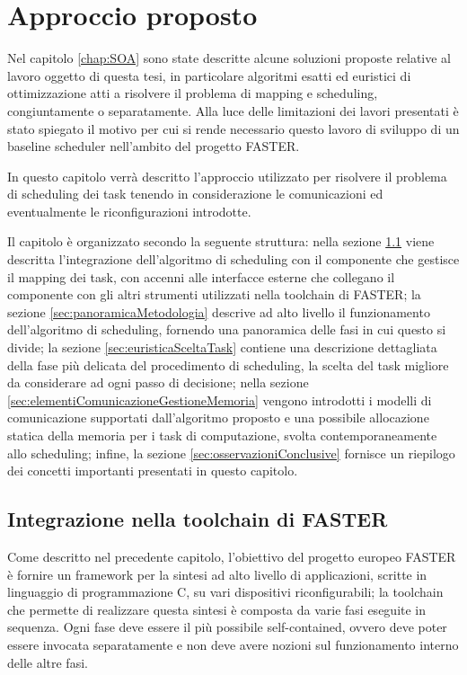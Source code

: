 \chapter{Approccio proposto}
\label{chap:approccio}
\vspace{1cm}
Nel capitolo \ref{chap:SOA} sono state descritte alcune soluzioni proposte 
relative al lavoro oggetto di questa tesi, in particolare algoritmi esatti ed
euristici di ottimizzazione atti a risolvere il problema di mapping e 
scheduling, congiuntamente o separatamente. Alla luce delle limitazioni dei 
lavori presentati è stato spiegato il motivo per cui si rende necessario questo 
lavoro di sviluppo di un baseline scheduler nell'ambito del progetto 
\ac{FASTER}.

In questo capitolo verrà descritto l'approccio utilizzato per risolvere il 
problema di scheduling dei task tenendo in considerazione le comunicazioni ed
eventualmente le riconfigurazioni introdotte.

Il capitolo è organizzato secondo la seguente struttura: nella sezione 
\ref{sec:integrazioneToolchainFASTER} viene descritta l'integrazione 
dell'algoritmo di scheduling con il componente che gestisce il mapping dei task, 
con accenni alle interfacce esterne che collegano il componente 
con gli altri strumenti utilizzati nella toolchain di \acs{FASTER}; la sezione 
\ref{sec:panoramicaMetodologia} descrive ad alto livello il funzionamento 
dell'algoritmo di scheduling, fornendo una panoramica delle fasi in cui questo 
si divide; la sezione \ref{sec:euristicaSceltaTask} contiene una descrizione 
dettagliata della fase più delicata del procedimento di scheduling, la scelta 
del task migliore da considerare ad ogni passo di decisione; nella sezione 
\ref{sec:elementiComunicazioneGestioneMemoria} vengono introdotti i modelli di 
comunicazione supportati dall'algoritmo proposto e una possibile allocazione 
statica della memoria per i task di computazione, svolta contemporaneamente allo 
scheduling; infine, la sezione \ref{sec:osservazioniConclusive} fornisce un 
riepilogo dei concetti importanti presentati in questo capitolo.


\section{Integrazione nella toolchain di \acs{FASTER}}
\label{sec:integrazioneToolchainFASTER}

Come descritto nel precedente capitolo, l'obiettivo del progetto europeo 
\ac{FASTER} è fornire un framework per la sintesi ad alto livello di 
applicazioni, scritte in linguaggio di programmazione C, su vari dispositivi 
riconfigurabili; la toolchain che permette di realizzare questa sintesi è 
composta da varie fasi eseguite in sequenza. Ogni fase deve essere il più 
possibile self-contained, ovvero deve poter essere invocata separatamente e non 
deve avere nozioni sul funzionamento interno delle altre fasi.

